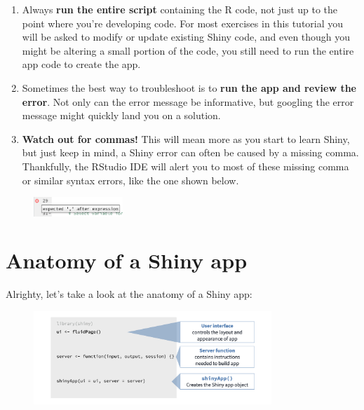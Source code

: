 \documentclass[
  letterpaper,
  DIV=11,
  numbers=noendperiod]{scrreprt}
\begin{document}
\begin{enumerate}
\def\labelenumi{\arabic{enumi}.}
\item
  Always \textbf{run the entire script} containing the R code, not just
  up to the point where you're developing code. For most exercises in
  this tutorial you will be asked to modify or update existing Shiny
  code, and even though you might be altering a small portion of the
  code, you still need to run the entire app code to create the app.
\item
  Sometimes the best way to troubleshoot is to \textbf{run the app and
  review the error}. Not only can the error message be informative, but
  googling the error message might quickly land you on a solution.
\item
  \textbf{Watch out for commas!} This will mean more as you start to
  learn Shiny, but just keep in mind, a Shiny error can often be caused
  by a missing comma. Thankfully, the RStudio IDE will alert you to most
  of these missing comma or similar syntax errors, like the one shown
  below.
\end{enumerate}

\begin{figure}

{\centering \includegraphics[width=0.3\textwidth,height=\textheight]{./images/missing-comma-ide.png}

}

\end{figure}

\hypertarget{anatomy-of-a-shiny-app}{%
\section{Anatomy of a Shiny app}\label{anatomy-of-a-shiny-app}}

Alrighty, let's take a look at the anatomy of a Shiny app:

\begin{figure}

{\centering \includegraphics[width=0.8\textwidth,height=\textheight]{./images/anatomy.png}

}

\end{figure}
\end{document}
